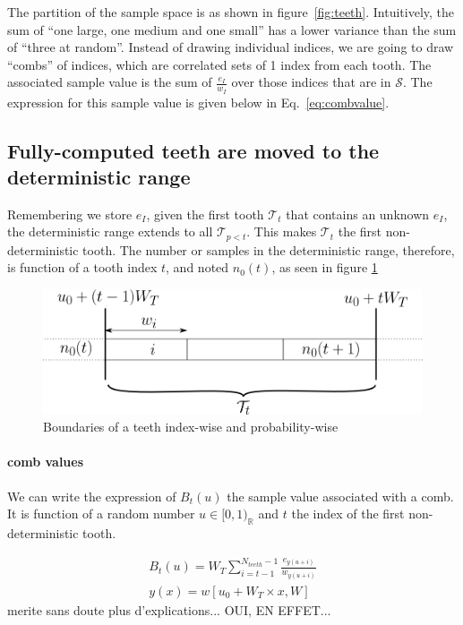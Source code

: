 \documentclass[./thesis.tex]{subfiles}
\begin{document}
The partition of the sample space is as shown in figure~\ref{fig:teeth}.
Intuitively, the sum of ``one large, one medium and one small'' has a lower variance than the sum of ``three at random''. Instead of drawing individual indices, we are going to draw ``combs'' of indices, which are correlated sets of 1 index from each tooth. The associated sample value is the sum of $\frac{e_I}{w_I}$ over those indices that are in $\mathcal{S}$.  The expression for this sample value is given below in Eq.~\eqref{eq:combvalue}.

\subsection{Fully-computed teeth are moved to the deterministic range}

Remembering we store $e_I$, given the first tooth $\mathcal{T}_t$ that contains an unknown $e_I$, the deterministic range extends to all $\mathcal{T}_{p<t}$. This makes $\mathcal{T}_t$ the first non-deterministic tooth.
The number or samples in the deterministic range, therefore, is function of a tooth index $t$, and noted $n_0(t)$, as seen in figure \ref{fig:boundaries_teeth}

\begin{figure}[h!]
	\begin{center}
		\includegraphics[width=0.8\columnwidth]{figures/pt2/tooththreshold}
	\end{center}
	\caption{Boundaries of a teeth index-wise and probability-wise}
	\label{fig:boundaries_teeth}
\end{figure}


\paragraph{comb values}

We can write the expression of $B_t(u)$ the sample value associated with a comb. It is function of a random number $u \in [0,1)_\mathbb{R}$ and $t$ the index of the first non-deterministic tooth.

\begin{align}
\label{eq:combvalue}
B_t(u) = W_T \sum_{i=t-1}^{N_{teeth}-1} \frac{e_{y(u+i)}}{w_{y(u+i)}} \\
y(x)=w[u_0+ W_T \times x, W]
\end{align}
\alert{merite sans doute plus d'explications... OUI, EN EFFET...}
\end{document}
